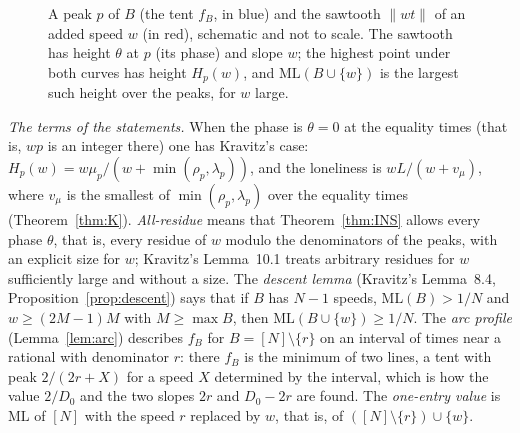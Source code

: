 \documentclass[11pt]{article}
\theoremstyle{definition}
\theoremstyle{remark}
\newcommand{\nd}[1]{\lVert #1\rVert}
\newcommand{\ML}{\mathrm{ML}}
\begin{document}
\begin{figure}[ht]
\centering
{}
\caption{A peak $p$ of $B$ (the tent $f_B$, in blue) and the sawtooth $\nd{wt}$ of an added speed $w$ (in red), schematic and not to scale. The sawtooth has height $\theta$ at $p$ (its phase) and slope $w$; the highest point under both curves has height $H_p(w)$, and $\ML(B\cup\{w\})$ is the largest such height over the peaks, for $w$ large.}
\label{fig:tent}
\end{figure}

\emph{The terms of the statements.} When the phase is $\theta=0$ at the equality times (that is, $wp$ is an integer there) one has Kravitz's case: $H_p(w)=w\mu_p/(w+\min(\rho_p,\lambda_p))$, and the loneliness is $wL/(w+v_\mu)$, where $v_\mu$ is the smallest of $\min(\rho_p,\lambda_p)$ over the equality times (Theorem~\ref{thm:K}). \emph{All-residue} means that Theorem~\ref{thm:INS} allows every phase $\theta$, that is, every residue of $w$ modulo the denominators of the peaks, with an explicit size for $w$; Kravitz's Lemma~10.1 treats arbitrary residues for $w$ sufficiently large and without a size. The \emph{descent lemma} (Kravitz's Lemma~8.4, Proposition~\ref{prop:descent}) says that if $B$ has $N-1$ speeds, $\ML(B)>1/N$ and $w\ge(2M-1)M$ with $M\ge\max B$, then $\ML(B\cup\{w\})\ge1/N$. The \emph{arc profile} (Lemma~\ref{lem:arc}) describes $f_B$ for $B=[N]\setminus\{r\}$ on an interval of times near a rational with denominator $r$: there $f_B$ is the minimum of two lines, a tent with peak $2/(2r+X)$ for a speed $X$ determined by the interval, which is how the value $2/D_0$ and the two slopes $2r$ and $D_0-2r$ are found. The \emph{one-entry value} is $\ML$ of $[N]$ with the speed $r$ replaced by $w$, that is, of $([N]\setminus\{r\})\cup\{w\}$.
\end{document}
